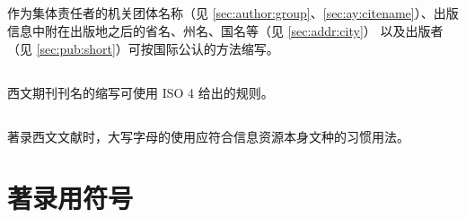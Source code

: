 \documentclass[twoside]{article}%
\begin{document}
{\subsection{} 作为集体责任者的机关团体名称（见 \ref{sec:author:group}、\ref{sec:ay:citename}）、出版信息中附在出版地之后的省名、州名、国名等（见 \ref{sec:addr:city}）
以及出版者（见 \ref{sec:pub:short}）可按国际公认的方法缩写。

\subsection{} 西文期刊刊名的缩写可使用 ISO 4 给出的规则。

\subsection{} 著录西文文献时，大写字母的使用应符合信息资源本身文种的习惯用法。


}

\section{著录用符号}\label{sec:biblio:symbol}
\end{document}
